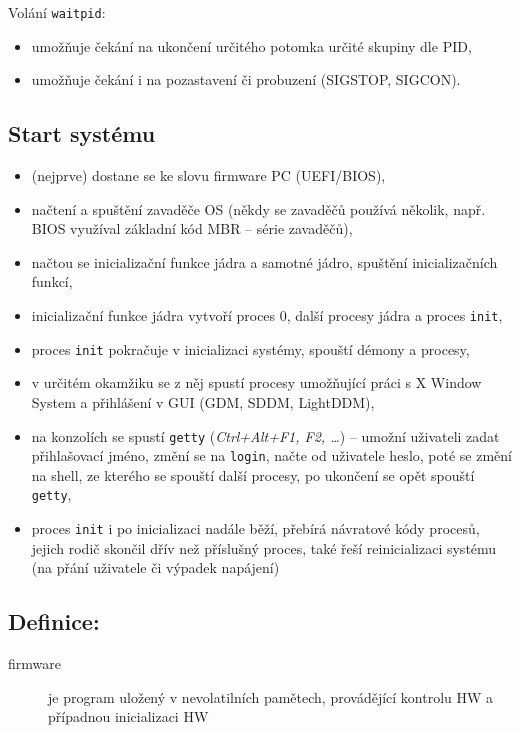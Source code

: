 \documentclass[a4paper, 11pt]{article}
\newcommand{\tcmd}[1]{\texttt{#1}}
\begin{document}
Volání \tcmd{waitpid}:
\begin{itemize}
 \item umožňuje čekání na ukončení určitého potomka určité skupiny dle PID,
 \item umožňuje čekání i na pozastavení či probuzení (SIGSTOP, SIGCON).
\end{itemize}

\subsection{Start systému}
\begin{itemize}
 \item (nejprve) dostane se ke slovu firmware PC (UEFI/BIOS),
 \item načtení a spuštění zavaděče OS (někdy se zavaděčů používá několik, např. BIOS využíval základní kód MBR -- série zavaděčů),
 \item načtou se inicializační funkce jádra a samotné jádro, spuštění inicializačních funkcí,
 \item inicializační funkce jádra vytvoří proces 0, další procesy jádra a proces \tcmd{init},
 \item proces \tcmd{init} pokračuje v inicializaci systémy, spouští démony a procesy,
 \item v určitém okamžiku se z něj spustí procesy umožňující práci s X Window System a přihlášení v GUI (GDM, SDDM, LightDDM),
 \item na konzolích se spustí \tcmd{getty} (\textit{Ctrl+Alt+F1, F2, \ldots}) -- umožní uživateli zadat přihlašovací jméno, změní se na \tcmd{login}, načte od uživatele heslo, poté se změní na shell, ze kterého se spouští další procesy, po ukončení se opět spouští \tcmd{getty},
 \item proces \tcmd{init} i po inicializaci nadále běží, přebírá návratové kódy procesů, jejich rodič skončil dřív než příslušný proces, také řeší reinicializaci systému (na přání uživatele či výpadek napájení)
\end{itemize}

\subsection*{Definice:}
\begin{description}
\item[firmware] je program uložený v nevolatilních pamětech, provádějící kontrolu HW a případnou inicializaci HW
\end{description}
\end{document}
